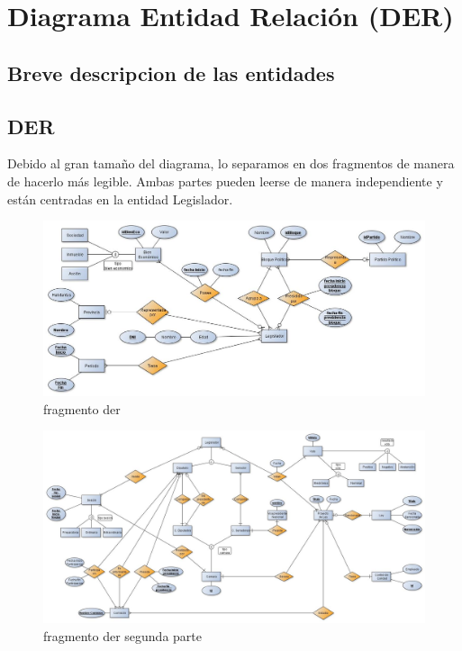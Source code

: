 \documentclass[10pt, a4paper]{article}
\begin{document}
\newpage

\section{Diagrama Entidad Relaci\'on (DER)}

	\subsection{Breve descripcion de las entidades}

		

	\newpage
	\subsection{DER}

		Debido al gran tama\~no del diagrama, lo separamos en dos fragmentos de manera de hacerlo m\'as legible. Ambas partes pueden leerse de manera independiente y est\'an centradas en la entidad Legislador.
			
		\begin{figure}[H]
		  \begin{center}
		    \includegraphics[scale=.40,angle=-90]{./imagenes/DER2-arriba.jpg}
		    \caption{fragmento der} 
		    \label{fig:derparte1}
		  \end{center}
		\end{figure}
				
		\begin{figure}[H]
		  \begin{center}
		    \includegraphics[scale=.35,angle=-90]{./imagenes/DER2-abajo.jpg}
		    \caption{fragmento der segunda parte} 
		    \label{fig:derparte2}
		  \end{center}
		\end{figure}
\end{document}
